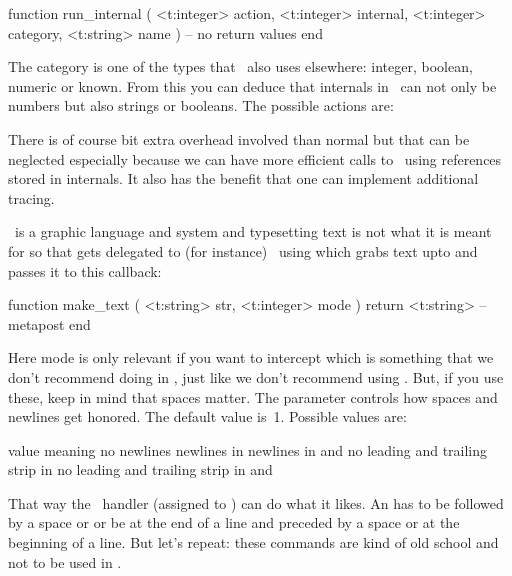 \starttyping[option=LUA]
function run_internal (
    <t:integer> action,
    <t:integer> internal,
    <t:integer> category,
    <t:string>  name
)
    -- no return values
end
\stoptyping

The category is one of the types that \METAPOST\ also uses elsewhere: integer,
boolean, numeric or known. From this you can deduce that internals in \LUAMETATEX\
can not only be numbers but also strings or booleans. The possible actions are:


There is of course bit extra overhead involved than normal but that can be
neglected especially because we can have more efficient calls to \LUA\ using
references stored in internals. It also has the benefit that one can implement
additional tracing.

\METAPOST\ is a graphic language and system and typesetting text is not what it
is meant for so that gets delegated to (for instance) \TEX\ using \type
[option=MP] {btex} which grabs text upto \type [option=MP] {etex} and passes it
to this callback:

\starttyping[option=LUA]
function make_text ( <t:string> str, <t:integer> mode )
    return <t:string> -- metapost
end
\stoptyping

Here mode is only relevant if you want to intercept  which is
something that we don't recommend doing in \CONTEXT, just like we don't recommend
using \type [option=MP] {btex}. But, if you use these, keep in mind that spaces
matter. The parameter \type [option=MP] {texscriptmode} controls how spaces and
newlines get honored. The default value is~1. Possible values are:

\starttabulate[|l|p|]
\FL
\BC value      \BC meaning \NC \NR
\ML
\NC {} \NC no newlines \NC \NR
\NC {} \NC newlines in  \NC \NR
\NC \type {2} \NC newlines in  and  \NC \NR
\NC \type {3} \NC no leading and trailing strip in  \NC \NR
\NC \type {4} \NC no leading and trailing strip in \type [option=MP] {verbatimtex} and  \NC \NR
\LL
\stoptabulate

That way the \LUA\ handler (assigned to ) can do what it likes.
An \type [option=MP] {etex} has to be followed by a space or \type [option=MP]
{;} or be at the end of a line and preceded by a space or at the beginning of a
line. But let's repeat: these commands are kind of old school and not to be used
in \LUAMETAFUN.

